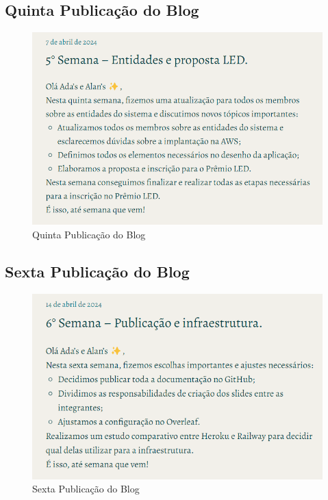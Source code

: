 \begin{apendicesenv}
\subsection*{Quinta Publicação do Blog}
\begin{figure}[H]
    \centering
    \includegraphics[width=1.0\linewidth]{images/Post5.png}
    \caption{Quinta Publicação do Blog}
    \label{fig:quinta}
\end{figure}

\subsection*{Sexta Publicação do Blog}
\begin{figure}[H]
    \centering
    \includegraphics[width=1.0\linewidth]{images/Post6.png}
    \caption{Sexta Publicação do Blog}
    \label{fig:sexta}
\end{figure}


\end{apendicesenv}
